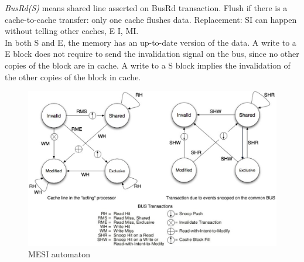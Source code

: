 \textit{BusRd(S)} means shared line asserted on BusRd transaction.
Flush if there is a cache-to-cache transfer: only one cache flushes data.
Replacement:
S\textrightarrow I can happen
without telling other
caches, E \textrightarrow I, M\textrightarrow I\@.\\
In both S and E, the memory has an up-to-date
version of the data.
A write to a E block does not require to send the
invalidation signal on the bus, since no other
copies of the block are in cache.
A write to a S block implies the invalidation of
the other copies of the block in cache.

\begin{figure}[h]
    \centering
    \includegraphics[width=\linewidth]{images/mesi-automata}
    \caption{MESI automaton}
    \label{fig:mesi-automaton}
\end{figure}